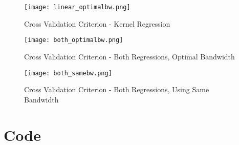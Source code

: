 \documentclass[]{report}
\newcommand{\0}{\bv{0}}
\newcommand{\1}{\bv{1}}
\begin{document}
\begin{enumerate}[1.]
\begin{enumerate}
\begin{figure}[hbtp]
	\begin{center}
		\caption{Cross Validation Criterion - Kernel Regression}
		\label{fig:reg_linear}
		\texttt{[image: linear\_optimalbw.png]}
	\end{center}
\end{figure}




\begin{figure}[hbtp]
	\begin{center}
		\caption{Cross Validation Criterion - Both Regressions, Optimal Bandwidth}
		\label{fig:reg_both}
		\texttt{[image: both\_optimalbw.png]}
	\end{center}
\end{figure}

\begin{figure}[hbtp]
	\begin{center}
		\caption{Cross Validation Criterion - Both Regressions, Using Same Bandwidth}
		\label{fig:reg_both_samebw}
		\texttt{[image: both\_samebw.png]}
	\end{center}
\end{figure}


\end{enumerate}
\end{enumerate}

\newpage
\section*{Code}
%
%
\end{document}
